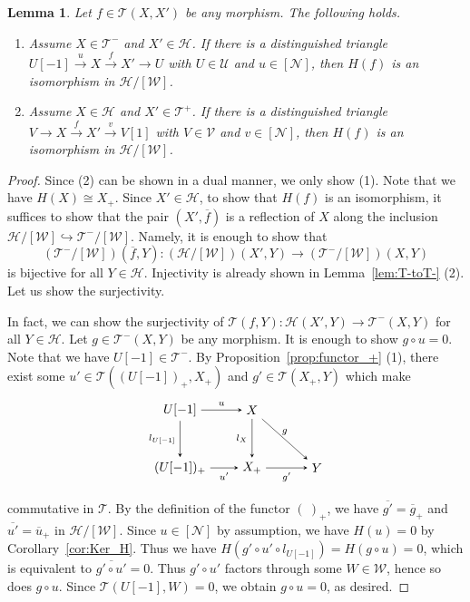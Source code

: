 \documentclass[a4paper,reqno,10pt]{amsart}
\DeclareRobustCommand{\darkblueedit}[1]{#1}
\newtheorem{lemma}[lemma]{Lemma}
\theoremstyle{definition}
\theoremstyle{definition}
\theoremstyle{definition}
\theoremstyle{definition}
\theoremstyle{plain}
\newcommand{\CH}{\mathcal{H}}
\newcommand{\CN}{\mathcal{N}}
\newcommand{\CT}{\mathcal{T}}
\newcommand{\CU}{\mathcal{U}}
\newcommand{\CV}{\mathcal{V}}
\newcommand{\CW}{\mathcal{W}}
\begin{document}
\begin{lemma}\label{lem:fully_faithful2}
Let $f\in\CT(X,X')$ be any morphism. The following holds.
\begin{enumerate}
\item Assume $X\in\CT^-$ and $X'\in\CH$. If there is a distinguished triangle $U[-1]\xrightarrow{u}X\xrightarrow{f}X'\to U$ with $U\in\CU$ and $u\in[\CN]$, then $H(f)$ is an isomorphism in 
\color{blue}
$\CH/[\CW]$.
\normalcolor
\item Assume $X\in\CH$ and $X'\in\CT^+$. If there is a distinguished triangle $V\to X\xrightarrow{f}X'\xrightarrow{v}V[1]$ with $V\in\CV$ and $v\in[\CN]$, then $H(f)$ is an isomorphism in 
\color{blue}
$\CH/[\CW]$.
\normalcolor
\end{enumerate}
\end{lemma}
\begin{proof}
Since {\rm (2)} can be shown in a dual manner, we only show {\rm (1)}.
Note that we have  $H(X)\cong X_+$.  Since $X'\in\CH$, to show that $H(f)$ is an isomorphism, it suffices to show that the pair 
\color{blue}
$(X',\overline{f})$ is a reflection of $X$ 
\normalcolor
along the inclusion $\CH/[\CW]\hookrightarrow\CT^-/[\CW]$. Namely, it is enough to show that
\[
(\CT^-/[\CW])(\overline{f},Y)\colon(\CH/[\CW])(X',Y)\to(\CT^-/[\CW])(X,Y)
\]
is bijective for all $Y\in\CH$. Injectivity is already shown in Lemma~\ref{lem:T-toT-} {\rm (2)}. Let us show the surjectivity.

In fact, we can show the surjectivity of 
$\CT(f,Y)\colon\CH(X',Y)\to\CT^-(X,Y)$
for all $Y\in\CH$. Let 
\color{blue}
$g\in\CT^-(X,Y)$ 
\normalcolor
be any morphism. It is enough to show $g\circ u=0$.
Note that we have $U[-1]\in\CT^-$. By Proposition~\ref{prop:functor_+} {\rm (1)}, there exist some $u'\in\CT((U[-1])_+,X_+)$ and $g'\in\CT(X_+,Y)$ which make
\[
\begin{tikzpicture}[>=stealth]
\node (1) at (-2,0.8) {$U[-1]$};
\node (2) at (0,0.8) {$X$};
\node (3) at (-2,-0.8) {$(U[-1])_+$};
\node (4) at (0,-0.8) {$X_+$};
\node (5) at (1.8,-0.8) {$Y$};
\draw[->] (1) -- node[above,font=\scriptsize] {$u$} (2);
\draw[->] (1) -- node[left,font=\scriptsize] {$l_{U[-1]}$} (3);
\draw[->] (2) -- node[left,font=\scriptsize] {$l_X$} (4);
\draw[->] (3) -- node[below,font=\scriptsize] {$u'$} (4);
\draw[->] (2) -- node[above,font=\scriptsize] {$g$} (5);
\draw[->] (4) -- node[below,font=\scriptsize] {$g'$} (5);
\end{tikzpicture}
\]
commutative in $\CT$. By \darkblueedit{the definition of the functor} $(\ )_+$, we have $\overline{g'}=\overline{g}_+$ and $\overline{u'}=\overline{u}_+$ in $\CH/[\CW]$. Since $u\in [\CN]$ by assumption, we have $H(u)=0$ by Corollary~\ref{cor:Ker_H}.
 Thus we have $H(g'\circ u'\circ l_{U[-1]})=H(g\circ u)=0$, which is equivalent to $\overline{g'\circ u'}=0$. 
Thus $g'\circ u'$ factors through some $W\in\CW$, hence so does $g\circ u$.
Since $\CT(U[-1],W)=0$, we obtain $g\circ u=0$, as desired.
\end{proof}
\end{document}
